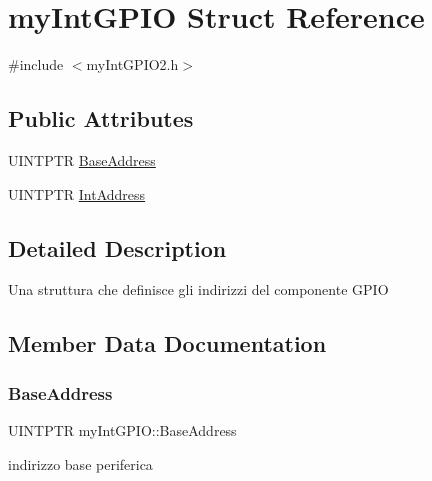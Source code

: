 \hypertarget{structmyIntGPIO}{}\section{my\+Int\+G\+P\+IO Struct Reference}
\label{structmyIntGPIO}


{\ttfamily \#include $<$my\+Int\+G\+P\+I\+O2.\+h$>$}

\subsection*{Public Attributes}
\textbf{ }\par
\begin{DoxyCompactItemize}
\item 
U\+I\+N\+T\+P\+TR \hyperlink{structmyIntGPIO_a2b221859a21d89871f221022583b2898}{Base\+Address}
\item 
U\+I\+N\+T\+P\+TR \hyperlink{structmyIntGPIO_a41e8c32e3191ea5083b7ecd31e8eb4cb}{Int\+Address}
\end{DoxyCompactItemize}



\subsection{Detailed Description}
Una struttura che definisce gli indirizzi del componente G\+P\+IO 

\subsection{Member Data Documentation}
\mbox{\label{structmyIntGPIO_a2b221859a21d89871f221022583b2898}} 
\subsubsection{\texorpdfstring{Base\+Address}{BaseAddress}}
{\footnotesize\ttfamily U\+I\+N\+T\+P\+TR my\+Int\+G\+P\+I\+O\+::\+Base\+Address}

indirizzo base periferica \mbox{\label{structmyIntGPIO_a41e8c32e3191ea5083b7ecd31e8eb4cb}} 
